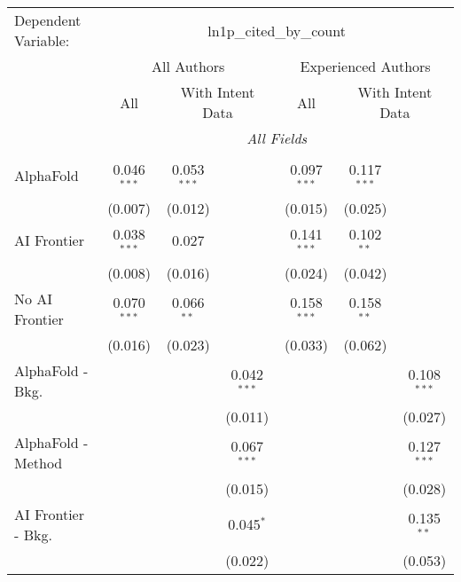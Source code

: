\begingroup
\centering
\begin{tabular}{lcccccc}
   \tabularnewline \midrule \midrule
   Dependent Variable: & \multicolumn{6}{c}{ln1p\_cited\_by\_count}\\
 & \multicolumn{3}{c}{All Authors} & \multicolumn{3}{c}{Experienced Authors} \\
\cmidrule(lr){2-4} \cmidrule(lr){5-7}
 & \multicolumn{1}{c}{All} & \multicolumn{2}{c}{With Intent Data} & \multicolumn{1}{c}{All} & \multicolumn{2}{c}{With Intent Data} \\
\cmidrule(lr){2-2} \cmidrule(lr){3-4} \cmidrule(lr){5-5} \cmidrule(lr){6-7}
 & \multicolumn{6}{c}{\textit{All Fields}} \\ \\
   AlphaFold               & 0.046$^{***}$ & 0.053$^{***}$ &               & 0.097$^{***}$ & 0.117$^{***}$ &   \\   
                           & (0.007)       & (0.012)       &               & (0.015)       & (0.025)       &   \\   
   AI Frontier             & 0.038$^{***}$ & 0.027         &               & 0.141$^{***}$ & 0.102$^{**}$  &   \\   
                           & (0.008)       & (0.016)       &               & (0.024)       & (0.042)       &   \\   
   No AI Frontier          & 0.070$^{***}$ & 0.066$^{**}$  &               & 0.158$^{***}$ & 0.158$^{**}$  &   \\   
                           & (0.016)       & (0.023)       &               & (0.033)       & (0.062)       &   \\   
   AlphaFold - Bkg.        &               &               & 0.042$^{***}$ &               &               & 0.108$^{***}$\\   
                           &               &               & (0.011)       &               &               & (0.027)\\   
   AlphaFold - Method      &               &               & 0.067$^{***}$ &               &               & 0.127$^{***}$\\   
                           &               &               & (0.015)       &               &               & (0.028)\\   
   AI Frontier - Bkg.      &               &               & 0.045$^{*}$   &               &               & 0.135$^{**}$\\   
                           &               &               & (0.022)       &               &               & (0.053)\\   

\end{tabular}
